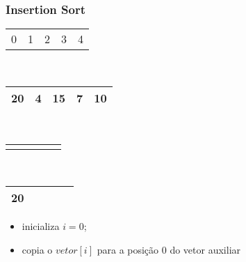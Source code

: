 \documentclass{beamer}
\begin{document}
\begin{frame}
    \frametitle{Insertion Sort}
    \begin{center}
        \begin{table}
            \begin{tabular}{p{0.25cm} p{0.25cm} p{0.25cm} p{0.25cm} p{0.25cm}}
                0 & 1 & 2 & 3 & 4
            \end{tabular} \\
            \begin{tabular}{| p{0.25cm} | p{0.25cm} | p{0.25cm} | p{0.25cm} | p{0.25cm} |}
                \hline
                20 & 4 & 15 & 7 & 10 \\ \hline
            \end{tabular} \\
            \begin{tabular}{p{0.25cm} p{0.25cm} p{0.25cm} p{0.25cm} p{0.25cm}}
                \color{blue}{$\updownarrow$} & & & &
            \end{tabular} \\
            \begin{tabular}{| p{0.25cm} | p{0.25cm} | p{0.25cm} | p{0.25cm} | p{0.25cm} |}
                \hline
                20 & & & & \\ \hline
            \end{tabular}
        \end{table}
	\end{center}
    \begin{itemize}[<+->]
        \item inicializa $i = 0$;
        \item copia o $vetor[i]$ para a posição 0 do vetor auxiliar
    \end{itemize}
\end{frame}
\end{document}

